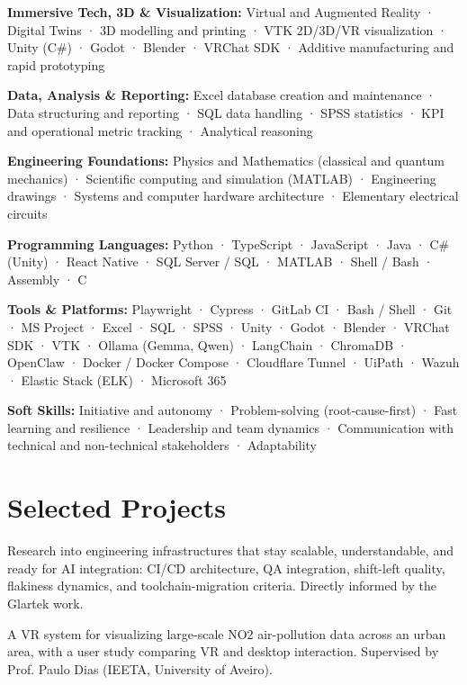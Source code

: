 \documentclass[10pt,a4paper]{article}
\newcommand{\cvskill}[2]{\par{\bfseries #1:} #2\par}
\newcommand{\cvmoreprojects}[1]{\needspace{2\baselineskip}\vspace{2pt}{\bfseries Also built:} #1\par}
\newcommand{\cvproject}[3]{\needspace{4\baselineskip}\vspace{2pt}{\bfseries #1}\par\vspace{-4pt}{\itshape\small Tech stack: #2\par}\vspace{-4pt}#3\par}
\begin{document}
\cvskill{Immersive Tech, 3D \& Visualization}{Virtual and Augmented Reality · Digital Twins · 3D modelling and printing · VTK 2D/3D/VR visualization · Unity (C\#) · Godot · Blender · VRChat SDK · Additive manufacturing and rapid prototyping}
\cvskill{Data, Analysis \& Reporting}{Excel database creation and maintenance · Data structuring and reporting · SQL data handling · SPSS statistics · KPI and operational metric tracking · Analytical reasoning}
\cvskill{Engineering Foundations}{Physics and Mathematics (classical and quantum mechanics) · Scientific computing and simulation (MATLAB) · Engineering drawings · Systems and computer hardware architecture · Elementary electrical circuits}
\cvskill{Programming Languages}{Python · TypeScript · JavaScript · Java · C\# (Unity) · React Native · SQL Server / SQL · MATLAB · Shell / Bash · Assembly · C}
\cvskill{Tools \& Platforms}{Playwright · Cypress · GitLab CI · Bash / Shell · Git · MS Project · Excel · SQL · SPSS · Unity · Godot · Blender · VRChat SDK · VTK · Ollama (Gemma, Qwen) · LangChain · ChromaDB · OpenClaw · Docker / Docker Compose · Cloudflare Tunnel · UiPath · Wazuh · Elastic Stack (ELK) · Microsoft 365}
\cvskill{Soft Skills}{Initiative and autonomy · Problem-solving (root-cause-first) · Fast learning and resilience · Leadership and team dynamics · Communication with technical and non-technical stakeholders · Adaptability}


\section{Selected Projects}

\cvproject{Lean-Driven QA \& CI/CD Re-Engineering Towards AI-Ready Infrastructures (Master's Thesis)}{CI/CD architecture · QA architecture · Test-suite optimization · Research}{Research into engineering infrastructures that stay scalable, understandable, and ready for AI integration: CI/CD architecture, QA integration, shift-left quality, flakiness dynamics, and toolchain-migration criteria. Directly informed by the Glartek work.}

\cvproject{Big Data Analysis \& Representation: NO2 Air Pollution in VR (Bachelor's Final Project)}{OpenXR · VTK · Unity · 3D}{A VR system for visualizing large-scale NO2 air-pollution data across an urban area, with a user study comparing VR and desktop interaction. Supervised by Prof. Paulo Dias (IEETA, University of Aveiro).}
\end{document}
